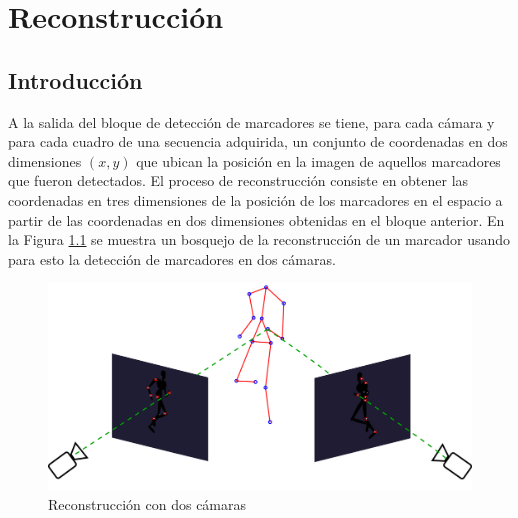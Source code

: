 \chapter{Reconstrucción}\label{reconstruccion}




\section{Introducción}
A la salida del bloque de detección de marcadores se tiene, para cada cámara y para cada cuadro de una secuencia adquirida, un conjunto de coordenadas en dos dimensiones $(x,y)$ que ubican la posición en la imagen de aquellos marcadores que fueron detectados.
El proceso de reconstrucción consiste en obtener las coordenadas en tres dimensiones de la posición de los marcadores en el espacio a partir de las coordenadas en dos dimensiones obtenidas en el bloque anterior.
En la Figura \ref{fig: esquema_reconstruccion} se muestra un bosquejo de la reconstrucción de un marcador usando para esto la detección de marcadores en dos cámaras.\\

\begin{figure}[ht!]
\begin{center}
\includegraphics[scale=0.20]{img/Reconstruccion/reconstruccion}
\end{center}
\caption{Reconstrucción con dos cámaras}
\label{fig: esquema_reconstruccion}
\end{figure}

